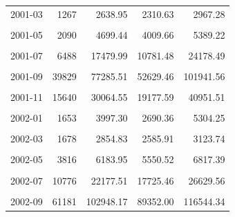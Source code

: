\begin{longtable}[t]{crrrr}
2001-03 & 1267 & 2638.95 & 2310.63 & 2967.28\\
\cellcolor{gray!10}{2001-04} & \cellcolor{gray!10}{1081} & \cellcolor{gray!10}{2731.07} & \cellcolor{gray!10}{2433.27} & \cellcolor{gray!10}{3028.87}\\
2001-05 & 2090 & 4699.44 & 4009.66 & 5389.22\\
\cellcolor{gray!10}{2001-06} & \cellcolor{gray!10}{8405} & \cellcolor{gray!10}{13627.03} & \cellcolor{gray!10}{10576.91} & \cellcolor{gray!10}{16677.16}\\
2001-07 & 6488 & 17479.99 & 10781.48 & 24178.49\\
\cellcolor{gray!10}{2001-08} & \cellcolor{gray!10}{31838} & \cellcolor{gray!10}{71629.68} & \cellcolor{gray!10}{51128.54} & \cellcolor{gray!10}{92130.82}\\
2001-09 & 39829 & 77285.51 & 52629.46 & 101941.56\\
\cellcolor{gray!10}{2001-10} & \cellcolor{gray!10}{31039} & \cellcolor{gray!10}{45894.05} & \cellcolor{gray!10}{43236.57} & \cellcolor{gray!10}{48551.53}\\
2001-11 & 15640 & 30064.55 & 19177.59 & 40951.51\\
\cellcolor{gray!10}{2001-12} & \cellcolor{gray!10}{6200} & \cellcolor{gray!10}{13818.18} & \cellcolor{gray!10}{8668.65} & \cellcolor{gray!10}{18967.71}\\
2002-01 & 1653 & 3997.30 & 2690.36 & 5304.25\\
\cellcolor{gray!10}{2002-02} & \cellcolor{gray!10}{1569} & \cellcolor{gray!10}{2661.16} & \cellcolor{gray!10}{2052.02} & \cellcolor{gray!10}{3270.31}\\
2002-03 & 1678 & 2854.83 & 2585.91 & 3123.74\\
\cellcolor{gray!10}{2002-04} & \cellcolor{gray!10}{1683} & \cellcolor{gray!10}{3406.00} & \cellcolor{gray!10}{2926.85} & \cellcolor{gray!10}{3885.16}\\
2002-05 & 3816 & 6183.95 & 5550.52 & 6817.39\\
\cellcolor{gray!10}{2002-06} & \cellcolor{gray!10}{10845} & \cellcolor{gray!10}{16064.77} & \cellcolor{gray!10}{12164.85} & \cellcolor{gray!10}{19964.68}\\
2002-07 & 10776 & 22177.51 & 17725.46 & 26629.56\\
\cellcolor{gray!10}{2002-08} & \cellcolor{gray!10}{47317} & \cellcolor{gray!10}{72018.72} & \cellcolor{gray!10}{43832.09} & \cellcolor{gray!10}{100205.35}\\
2002-09 & 61181 & 102948.17 & 89352.00 & 116544.34\\

\end{longtable}

